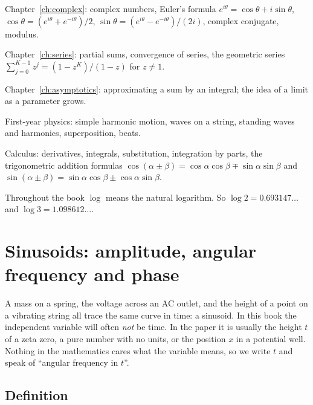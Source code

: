 \begin{prerequisites}
\item Chapter~\ref{ch:complex}: complex numbers, Euler's formula $e^{i\theta}=\cos\theta+i\sin\theta$, $\cos\theta=(e^{i\theta}+e^{-i\theta})/2$, $\sin\theta=(e^{i\theta}-e^{-i\theta})/(2i)$, complex conjugate, modulus.
\item Chapter~\ref{ch:series}: partial sums, convergence of series, the geometric series $\sum_{j=0}^{K-1}z^j=(1-z^K)/(1-z)$ for $z\neq1$.
\item Chapter~\ref{ch:asymptotics}: approximating a sum by an integral; the idea of a limit as a parameter grows.
\item First-year physics: simple harmonic motion, waves on a string, standing waves and harmonics, superposition, beats.
\item Calculus: derivatives, integrals, substitution, integration by parts, the trigonometric addition formulas $\cos(\alpha\pm\beta)=\cos\alpha\cos\beta\mp\sin\alpha\sin\beta$ and $\sin(\alpha\pm\beta)=\sin\alpha\cos\beta\pm\cos\alpha\sin\beta$.
\end{prerequisites}

Throughout the book $\log$ means the natural logarithm. So $\log 2=0.693147\ldots$ and $\log 3=1.098612\ldots$.

\section{Sinusoids: amplitude, angular frequency and phase}\label{sec:fourier-series-sinusoids}

A mass on a spring, the voltage across an AC outlet, and the height of a point on a vibrating string all trace the same curve in time: a sinusoid. In this book the independent variable will often \emph{not} be time. In the paper it is usually the height $t$ of a zeta zero, a pure number with no units, or the position $x$ in a potential well. Nothing in the mathematics cares what the variable means, so we write $t$ and speak of ``angular frequency in $t$''.

\subsection{Definition}

